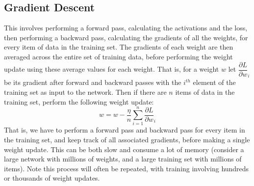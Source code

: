 \documentclass[11pt]{article} %
\theoremstyle{plain}
\theoremstyle{definition}
\begin{document}
\subsection{Gradient Descent}
This involves performing a forward pass, calculating the activations and the loss, then performing a backward pass, calculating the gradients of all the weights, for every item of data in the training set. The gradients of each weight are then averaged across the entire set of training data, before performing the weight update using these average values for each weight. That is, for a weight \(w\) let  \({\dfrac{\partial L}{\partial w}}_i\) be its gradient after  forward and backward passes with the \(i^{th}\) element of the training set as input to the network. Then if there are \(n\) items of data in the training set, perform the following weight update:
\[ w = w - \dfrac{\eta}{n}\sum_{i=1}^{n} {\dfrac{\partial L}{\partial w}}_i \]
That is, we have to perform a forward pass and backward pass for every item in the training set, and keep track of all associated gradients, before making a single weight update. This can be both slow and consume a lot of memory (consider a large network with millions of weights, and a large training set with millions of items). Note this process will often be repeated, with training involving hundreds or thousands of weight updates.
\end{document}
